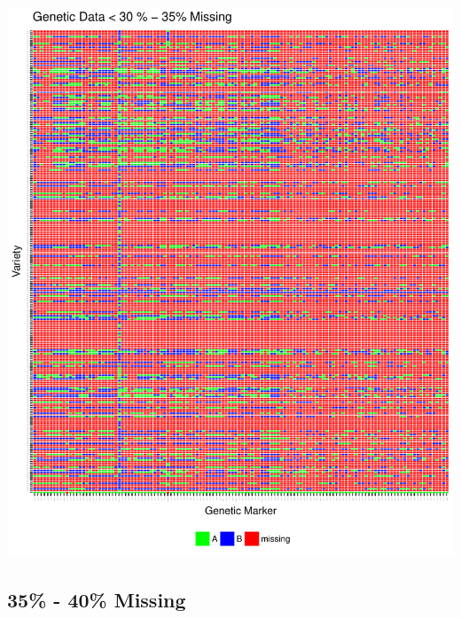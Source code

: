 \documentclass[11pt]{article}\usepackage[]{graphicx}\usepackage[]{color}
\makeatletter
\def\maxwidth{ %
  \ifdim\Gin@nat@width>\linewidth
    \linewidth
  \else
    \Gin@nat@width
  \fi
}
\newenvironment{knitrout}{}{} %
\makeatother
\begin{document}
\begin{knitrout}\footnotesize
{}\color{fgcolor}

{\centering \includegraphics[width=\maxwidth]{figure/missing_plot35-1} 

}



\end{knitrout}
\pagebreak
\subsection{35\% - 40\% Missing}
\end{document}
